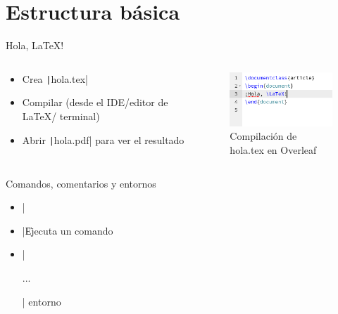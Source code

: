 \section{Estructura básica}

\begin{frame}[fragile]{Hola, \LaTeX!}
  \begin{columns}
    \begin{column}{.7\linewidth}
      \begin{itemize}
        \item Crea \texttt|hola.tex|
        \item Compilar (desde el IDE/editor de \LaTeX / terminal)
        \item Abrir \texttt|hola.pdf| para ver el resultado
      \end{itemize}
    \end{column}
    \begin{column}{.3\linewidth}
      \begin{figure}
        \centering
        \includegraphics[width=150]{./assets/ejemplo1.png}
        \caption{Compilación de hola.tex en Overleaf}
      \end{figure}
    \end{column}
  \end{columns}
\end{frame}
\begin{frame}[fragile]{Comandos, comentarios y entornos}
  \begin{itemize}
    \item \latexinline|%
    \item \latexinline|\| Ejecuta un comando
          \begin{latexcode}
            \command %
          \end{latexcode}
    \item \latexinline|\begin{} ... \end{}| entorno
          \begin{latexcode}
            \begin{entorno}
            \end{entorno}
          \end{latexcode}
  \end{itemize}
\end{frame}
